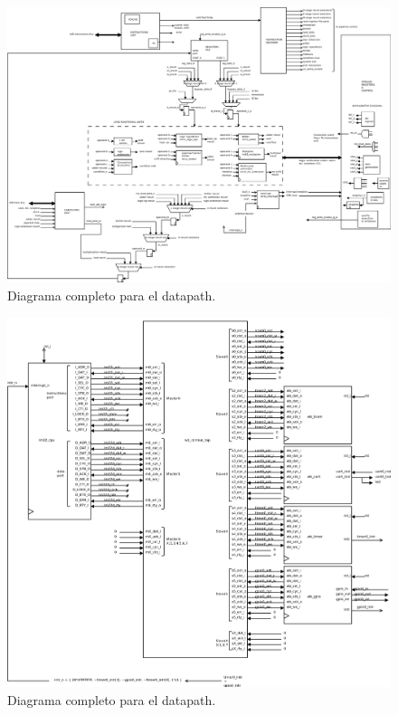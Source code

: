 \documentclass[11pt,graphicx,caption,rotating]{article}
\begin{document}
\begin{landscape}
\begin{figure}[H]
	\centering
		\includegraphics[scale=0.32]{DATAPATH.png}
	\caption{Diagrama completo para el datapath.}
	\label{fig2}
\end{figure}
\begin{figure}[H]
	\centering
		\includegraphics[scale=0.32]{system_v2.png}
	\caption{Diagrama completo para el datapath.}
	\label{fig3}
\end{figure}
\end{landscape}
\end{document}
